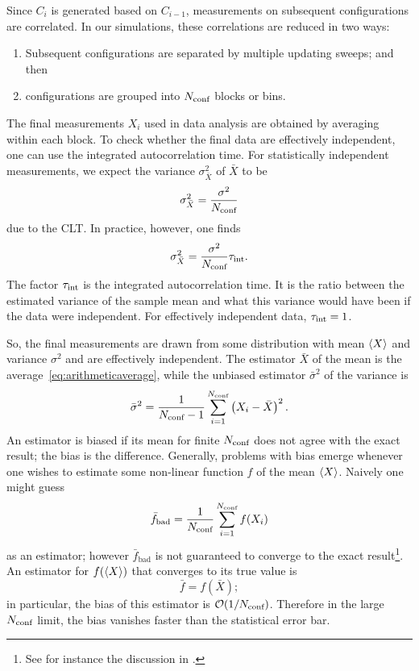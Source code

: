 Since $C_i$ is generated based on $C_{i-1}$, measurements on subsequent
configurations are correlated. In our simulations, these
correlations are reduced in two ways:
\begin{enumerate}
  \item Subsequent configurations are separated by multiple updating sweeps;
        and then
  \item configurations are grouped into $N_{\text{conf}}$ blocks or bins.
\end{enumerate}
The final measurements $X_i$ used in data analysis are obtained by averaging
within each block.
To check whether the final data are effectively independent, one can use
the integrated autocorrelation time. 
For statistically independent measurements, we expect the variance 
$\sigma^2_{\bar{X}}$ of $\bar{X}$ to be
\begin{equation}
  \sigma^2_{\bar{X}}=\frac{\sigma^2}{N_{\text{conf}}}
\end{equation}
due to the CLT. In practice, however, one finds 
\begin{equation}
  \sigma^2_{\bar{X}}=\frac{\sigma^2}{N_{\text{conf}}}\tau_\text{int}.
\end{equation}
The factor $\tau_\text{int}$ is the integrated autocorrelation time. It is the 
ratio between the estimated variance of the sample
mean and what this variance would have been if the data were independent.
For effectively independent data, $\tau_\text{int}=1$.

So, the final measurements are drawn from some
distribution with mean $\ev{X}$ and variance $\sigma^2$
and are effectively independent. The
estimator $\bar{X}$ of the mean is the average~\eqref{eq:arithmeticaverage}, 
while the unbiased estimator $\bar{\sigma}^2$ of the variance is
\begin{equation}\label{eq:estimatorvariance}
  \bar{\sigma}^2=\frac{1}{N_{\text{conf}}-1}\sum_{i=1}^{N_{\text{conf}}}
      \left(X_i-\bar{X}\right)^2.
\end{equation}
An estimator is biased if its mean for finite $N_{\text{conf}}$ 
does not agree with the exact result;
the bias is the difference. Generally, problems with bias emerge whenever
one wishes to estimate some non-linear function $f$ of the mean $\ev{X}$.
Naively one might guess
\begin{equation}
  \bar{f}_\text{bad}=\frac{1}{N_{\text{conf}}}\sum_{i=1}^{N_{\text{conf}}}f(X_i)
\end{equation}
as an estimator; however $\bar{f}_\text{bad}$ is not guaranteed
to converge to the exact result\footnote{See for instance the discussion
in .}. 
An estimator for $f(\ev{X})$ that converges to its true value is
\begin{equation}\label{eq:MCMCconsistentEst}
  \bar{f}=f(\bar{X});
\end{equation}
in particular, the bias of this estimator is $\order{1/\nconf}$.
Therefore in the large $N_{\text{conf}}$ limit, the bias vanishes faster than the 
statistical error bar.

